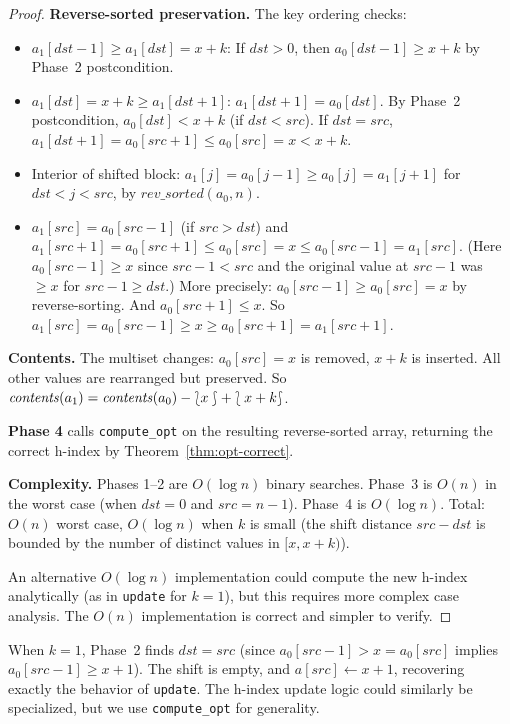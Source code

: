 \begin{proof}
\textbf{Reverse-sorted preservation.}
The key ordering checks:
\begin{itemize}
  \item $a_1[\mathit{dst}{-}1] \geq a_1[\mathit{dst}] = x+k$:
    If $\mathit{dst} > 0$, then $a_0[\mathit{dst}{-}1] \geq x + k$ by Phase~2 postcondition. \checkmark
  \item $a_1[\mathit{dst}] = x+k \geq a_1[\mathit{dst}{+}1]$:
    $a_1[\mathit{dst}{+}1] = a_0[\mathit{dst}]$. By Phase~2 postcondition,
    $a_0[\mathit{dst}] < x + k$ (if $\mathit{dst} < \mathit{src}$). If $\mathit{dst} = \mathit{src}$,
    $a_1[\mathit{dst}{+}1] = a_0[\mathit{src}{+}1] \leq a_0[\mathit{src}] = x < x+k$. \checkmark
  \item Interior of shifted block: $a_1[j] = a_0[j{-}1] \geq a_0[j] = a_1[j{+}1]$ for
    $\mathit{dst} < j < \mathit{src}$, by $\mathit{rev\_sorted}(a_0, n)$. \checkmark
  \item $a_1[\mathit{src}] = a_0[\mathit{src}{-}1]$ (if $\mathit{src} > \mathit{dst}$) and
    $a_1[\mathit{src}{+}1] = a_0[\mathit{src}{+}1] \leq a_0[\mathit{src}] = x \leq a_0[\mathit{src}{-}1] = a_1[\mathit{src}]$.
    (Here $a_0[\mathit{src}{-}1] \geq x$ since $\mathit{src}{-}1 < \mathit{src}$ and the original
    value at $\mathit{src}{-}1$ was $\geq x$ for $\mathit{src}{-}1 \geq \mathit{dst}$.)
    More precisely: $a_0[\mathit{src}{-}1] \geq a_0[\mathit{src}] = x$ by reverse-sorting.
    And $a_0[\mathit{src}{+}1] \leq x$. So $a_1[\mathit{src}] = a_0[\mathit{src}{-}1] \geq x \geq a_0[\mathit{src}{+}1] = a_1[\mathit{src}{+}1]$. \checkmark
\end{itemize}

\textbf{Contents.}
The multiset changes: $a_0[\mathit{src}] = x$ is removed, $x + k$ is inserted.
All other values are rearranged but preserved. So
$\mathit{contents}(a_1) = \mathit{contents}(a_0) - \lbag x \rbag + \lbag x+k \rbag$.

\textbf{Phase 4} calls \texttt{compute\_opt} on the resulting reverse-sorted array,
returning the correct h-index by Theorem~\ref{thm:opt-correct}.

\textbf{Complexity.} Phases 1--2 are $O(\log n)$ binary searches.
Phase~3 is $O(n)$ in the worst case (when $\mathit{dst} = 0$ and $\mathit{src} = n{-}1$).
Phase~4 is $O(\log n)$. Total: $O(n)$ worst case, $O(\log n)$ when $k$ is small
(the shift distance $\mathit{src} - \mathit{dst}$ is bounded by the number of
distinct values in $[x, x+k)$).

An alternative $O(\log n)$ implementation could compute the new h-index analytically
(as in \texttt{update} for $k=1$), but this requires more complex case analysis.
The $O(n)$ implementation is correct and simpler to verify.
\end{proof}

\begin{remark}[Specialization to $k=1$]
When $k = 1$, Phase~2 finds $\mathit{dst} = \mathit{src}$ (since $a_0[\mathit{src}{-}1] > x = a_0[\mathit{src}]$
implies $a_0[\mathit{src}{-}1] \geq x+1$). The shift is empty, and
$a[\mathit{src}] \gets x + 1$, recovering exactly the behavior of \texttt{update}.
The h-index update logic could similarly be specialized, but we use \texttt{compute\_opt}
for generality.
\end{remark}
